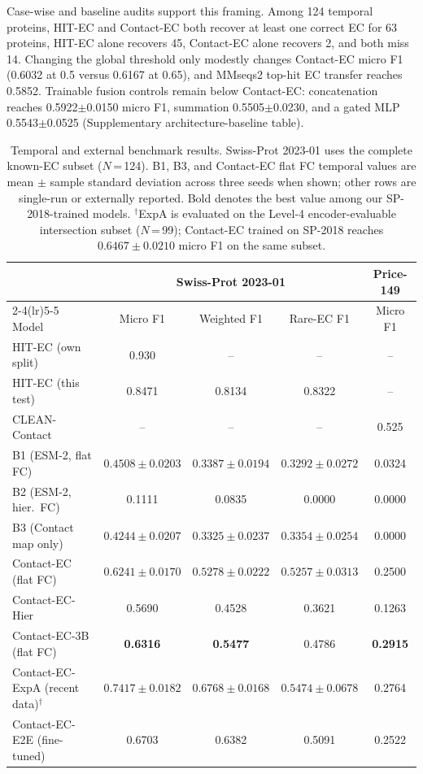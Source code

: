 \documentclass[numbered,contemporary,mediumone]{oup-authoring-template}
\begin{document}
Case-wise and baseline audits support this framing. Among 124 temporal proteins,
HIT-EC and Contact-EC both recover at least one correct EC for 63 proteins,
HIT-EC alone recovers 45, Contact-EC alone recovers 2, and both miss 14.
Changing the global threshold only modestly changes Contact-EC micro F1 (0.6032
at 0.5 versus 0.6167 at 0.65), and MMseqs2 top-hit EC transfer reaches 0.5852.
Trainable fusion controls remain below Contact-EC: concatenation reaches
0.5922$\pm$0.0150 micro F1, summation 0.5505$\pm$0.0230, and a gated MLP
0.5543$\pm$0.0525 (Supplementary architecture-baseline table).

\begin{table}[!htbp]
\centering
\caption{Temporal and external benchmark results. Swiss-Prot 2023-01 uses the
complete known-EC subset ($N$\,=\,124). B1, B3, and Contact-EC flat FC temporal
values are mean $\pm$ sample standard deviation across three seeds when shown;
other rows are single-run or externally reported. Bold denotes the best value among our
SP-2018-trained models. $^\dagger$ExpA is evaluated on the Level-4
encoder-evaluable intersection subset ($N$\,=\,99); Contact-EC trained on
SP-2018 reaches $0.6467\pm0.0210$ micro F1 on the same subset.}
\label{tab:main}
\scriptsize
\setlength{\tabcolsep}{3pt}
\begin{tabular}{lcccc}
\toprule
& \multicolumn{3}{c}{Swiss-Prot 2023-01} & Price-149 \\
\cmidrule(lr){2-4}\cmidrule(lr){5-5}
Model & Micro F1 & Weighted F1 & Rare-EC F1 & Micro F1 \\
\midrule
HIT-EC (own split)        & 0.930 & -- & -- & -- \\
HIT-EC (this test)        & 0.8471 & 0.8134 & 0.8322 & -- \\
CLEAN-Contact             & -- & -- & -- & 0.525 \\
\midrule
B1 (ESM-2, flat FC)       & $0.4508\pm0.0203$ & $0.3387\pm0.0194$ & $0.3292\pm0.0272$ & 0.0324 \\
B2 (ESM-2, hier.\ FC)     & 0.1111 & 0.0835 & 0.0000 & 0.0000 \\
B3 (Contact map only)     & $0.4244\pm0.0207$ & $0.3325\pm0.0237$ & $0.3354\pm0.0254$ & 0.0000 \\
Contact-EC (flat FC)      & $0.6241\pm0.0170$ & $0.5278\pm0.0222$ & $\mathbf{0.5257\pm0.0313}$ & 0.2500 \\
Contact-EC-Hier           & 0.5690 & 0.4528 & 0.3621 & 0.1263 \\
Contact-EC-3B (flat FC)   & \textbf{0.6316} & \textbf{0.5477} & 0.4786 & \textbf{0.2915} \\
\midrule
Contact-EC-ExpA (recent data)$^\dagger$ & $0.7417\pm0.0182$ & $0.6768\pm0.0168$ & $0.5474\pm0.0678$ & 0.2764 \\
Contact-EC-E2E (fine-tuned)   & 0.6703 & 0.6382 & 0.5091 & 0.2522 \\
\bottomrule
\end{tabular}
\end{table}
\end{document}
